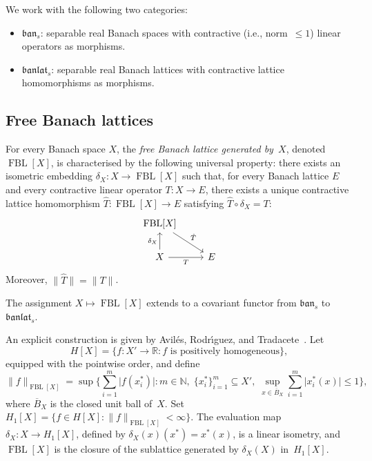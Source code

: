 \documentclass[12pt]{amsart}
\renewcommand{\le}{\leqslant}
\theoremstyle{plain}
\theoremstyle{definition}
\theoremstyle{remark}
\DeclareMathOperator{\FBL}{FBL}
\newcommand{\R}{\mathbb{R}}
\newcommand{\N}{\mathbb{N}}
\begin{document}
We work with the following two categories:
\begin{itemize}
    \item $\mathfrak{ban}_s$: separable real Banach spaces with contractive
      (i.e., norm~$\le 1$) linear operators as morphisms.
    \item $\mathfrak{banlat}_s$: separable real Banach lattices with contractive
      lattice homomorphisms as morphisms.
\end{itemize}

\subsection{Free Banach lattices}\label{subsec:FBL}

For every Banach space $X$, the \emph{free Banach lattice generated by~$X$},
denoted $\FBL[X]$, is characterised by the following universal property: there
exists an isometric embedding $\delta_X \colon X \to \FBL[X]$ such that, for
every Banach lattice $E$ and every contractive linear operator
$T \colon X \to E$, there exists a unique contractive lattice homomorphism
$\hat{T} \colon \FBL[X] \to E$ satisfying $\hat{T} \circ \delta_X = T$:
\[
    \begin{tikzcd}
    \FBL[X] \arrow[rd, "\hat{T}"]  & \\
    X \arrow[r, "T"'] \arrow[u, "\delta_X"] & E
    \end{tikzcd}
\]
Moreover, $\lVert \hat{T} \rVert = \lVert T \rVert$.

The assignment $X \mapsto \FBL[X]$ extends to a covariant functor from
$\mathfrak{ban}_s$ to $\mathfrak{banlat}_s$.

An explicit construction is given by Avil\'es, Rodr\'\i guez, and
Tradacete~\cite{aviles2018free}.  Let
\[
    H[X] = \{f \colon X' \to \R \colon f \text{ is positively homogeneous}\},
\]
equipped with the pointwise order, and define
\[
    \lVert f \rVert_{\FBL[X]}
    = \sup\biggl\{\sum_{i=1}^m \lvert f(x_i^*) \rvert \colon
      m \in \N,\; \{x_i^*\}_{i=1}^m \subseteq X',\;
      \sup_{x \in \overline{B}_X} \sum_{i=1}^m \lvert x_i^*(x) \rvert
      \le 1 \biggr\},
\]
where $\overline{B}_X$ is the closed unit ball of~$X$.  Set
$H_1[X] = \{f \in H[X] \colon \lVert f \rVert_{\FBL[X]} < \infty\}$.
The evaluation map $\delta_X \colon X \to H_1[X]$, defined by
$\delta_X(x)(x^*) = x^*(x)$, is a linear isometry, and $\FBL[X]$ is the closure
of the sublattice generated by $\delta_X(X)$ in~$H_1[X]$.
\end{document}
